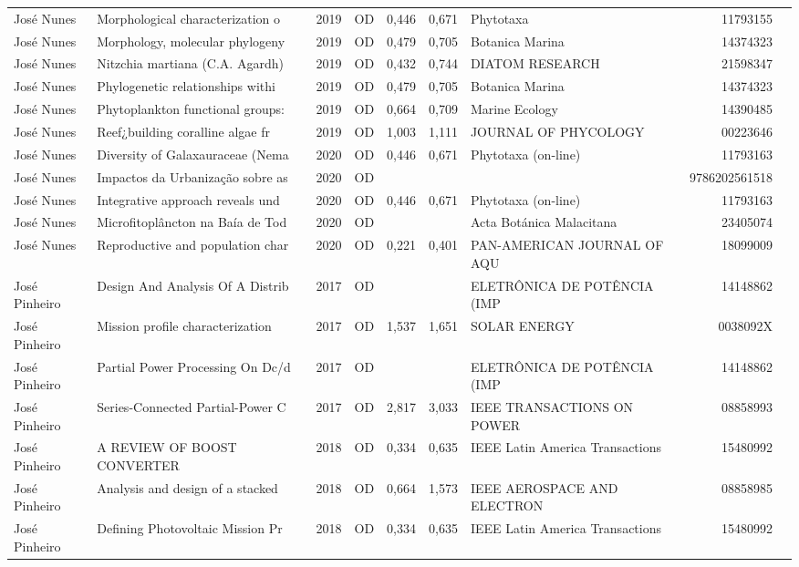 \documentclass[12pt,brazil]{article}\usepackage[]{graphicx}\usepackage[]{xcolor}
\begin{document}
\begin{longtable}{lllrrllrr}
José Nunes & Morphological characterization o & 2019 & OD & 0,446 & 0,671 & Phytotaxa & 11793155 \\
José Nunes & Morphology, molecular phylogeny  & 2019 & OD & 0,479 & 0,705 & Botanica Marina & 14374323 \\
José Nunes & Nitzchia martiana (C.A. Agardh)  & 2019 & OD & 0,432 & 0,744 & DIATOM RESEARCH & 21598347 \\
José Nunes & Phylogenetic relationships withi & 2019 & OD & 0,479 & 0,705 & Botanica Marina & 14374323 \\
José Nunes & Phytoplankton functional groups: & 2019 & OD & 0,664 & 0,709 & Marine Ecology & 14390485 \\
José Nunes & Reef¿building coralline algae fr & 2019 & OD & 1,003 & 1,111 & JOURNAL OF PHYCOLOGY & 00223646 \\
José Nunes & Diversity of Galaxauraceae (Nema & 2020 & OD & 0,446 & 0,671 & Phytotaxa (on-line) & 11793163 \\
José Nunes & Impactos da Urbanização sobre as & 2020 & OD &  &  &  & 9786202561518 \\
José Nunes & Integrative approach reveals und & 2020 & OD & 0,446 & 0,671 & Phytotaxa (on-line) & 11793163 \\
José Nunes & Microfitoplâncton na Baía de Tod & 2020 & OD &  &  & Acta Botánica Malacitana & 23405074 \\
José Nunes & Reproductive and population char & 2020 & OD & 0,221 & 0,401 & PAN-AMERICAN JOURNAL OF AQU & 18099009 \\
José Pinheiro & Design And Analysis Of A Distrib & 2017 & OD &  &  & ELETRÔNICA DE POTÊNCIA (IMP & 14148862 \\
José Pinheiro & Mission profile characterization & 2017 & OD & 1,537 & 1,651 & SOLAR ENERGY & 0038092X \\
José Pinheiro & Partial Power Processing On Dc/d & 2017 & OD &  &  & ELETRÔNICA DE POTÊNCIA (IMP & 14148862 \\
José Pinheiro & Series-Connected Partial-Power C & 2017 & OD & 2,817 & 3,033 & IEEE TRANSACTIONS ON POWER  & 08858993 \\
José Pinheiro & A REVIEW OF BOOST CONVERTER & 2018 & OD & 0,334 & 0,635 & IEEE Latin America Transactions & 15480992 \\
José Pinheiro & Analysis and design of a stacked & 2018 & OD & 0,664 & 1,573 & IEEE AEROSPACE AND ELECTRON & 08858985 \\
José Pinheiro & Defining Photovoltaic Mission Pr & 2018 & OD & 0,334 & 0,635 & IEEE Latin America Transactions & 15480992 \\

\end{longtable}
\end{document}
